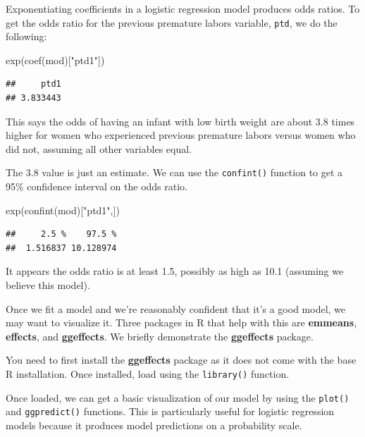 \documentclass[
]{book}
\newenvironment{Shaded}{\begin{snugshade}}{\end{snugshade}}
\newcommand{\FunctionTok}[1]{\textcolor[rgb]{0.00,0.00,0.00}{#1}}
\newcommand{\NormalTok}[1]{#1}
\newcommand{\StringTok}[1]{\textcolor[rgb]{0.31,0.60,0.02}{#1}}
\begin{document}
Exponentiating coefficients in a logistic regression model produces odds ratios. To get the odds ratio for the previous premature labors variable, \texttt{ptd}, we do the following:

\begin{Shaded}
\begin{Highlighting}[]
\FunctionTok{exp}\NormalTok{(}\FunctionTok{coef}\NormalTok{(mod)[}\StringTok{"ptd1"}\NormalTok{])}
\end{Highlighting}
\end{Shaded}

\begin{verbatim}
##     ptd1 
## 3.833443
\end{verbatim}

This says the odds of having an infant with low birth weight are about 3.8 times higher for women who experienced previous premature labors versus women who did not, assuming all other variables equal.

The 3.8 value is just an estimate. We can use the \texttt{confint()} function to get a 95\% confidence interval on the odds ratio.

\begin{Shaded}
\begin{Highlighting}[]
\FunctionTok{exp}\NormalTok{(}\FunctionTok{confint}\NormalTok{(mod)[}\StringTok{"ptd1"}\NormalTok{,])}
\end{Highlighting}
\end{Shaded}

\begin{verbatim}
##     2.5 %    97.5 % 
##  1.516837 10.128974
\end{verbatim}

It appears the odds ratio is at least 1.5, possibly as high as 10.1 (assuming we believe this model).

Once we fit a model and we're reasonably confident that it's a good model, we may want to visualize it. Three packages in R that help with this are \textbf{emmeans}, \textbf{effects}, and \textbf{ggeffects}. We briefly demonstrate the \textbf{ggeffects} package.

You need to first install the \textbf{ggeffects} package as it does not come with the base R installation. Once installed, load using the \texttt{library()} function.

Once loaded, we can get a basic visualization of our model by using the \texttt{plot()} and \texttt{ggpredict()} functions. This is particularly useful for logistic regression models because it produces model predictions on a probability scale.
\end{document}
